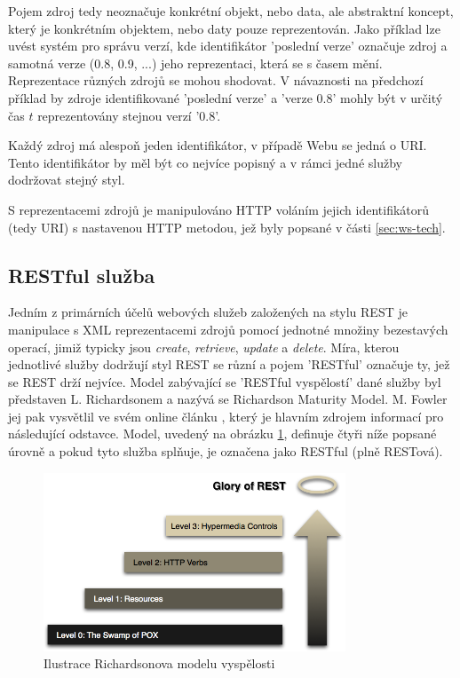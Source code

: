 \documentclass[czech,DP]{thesiskiv}
\begin{document}
Pojem zdroj tedy neoznačuje konkrétní objekt, nebo data, ale abstraktní koncept, který je konkrétním objektem, nebo daty pouze reprezentován. Jako příklad lze uvést systém pro správu verzí, kde identifikátor 'poslední verze' označuje zdroj a samotná verze (0.8, 0.9, ...) jeho reprezentaci, která se s časem mění. Reprezentace různých zdrojů se mohou shodovat. V návaznosti na předchozí příklad by zdroje identifikované 'poslední verze' a 'verze 0.8' mohly být v určitý čas $t$ reprezentovány stejnou verzí '0.8'. 

Každý zdroj má alespoň jeden identifikátor, v případě Webu se jedná o URI. Tento identifikátor by měl být co nejvíce popisný a v rámci jedné služby dodržovat stejný styl\cite{restfulWebServices}. 

S reprezentacemi zdrojů je manipulováno HTTP voláním jejich identifikátorů (tedy URI) s nastavenou HTTP metodou, jež byly popsané v části \ref{sec:ws-tech}.

\subsection{RESTful služba}
\label{sec:restful}

Jedním z primárních účelů webových služeb založených na stylu REST je manipulace s XML reprezentacemi zdrojů pomocí jednotné množiny bezestavých operací, jimiž typicky jsou  \textit{create}, \textit{retrieve}, \textit{update} a \textit{delete}\cite{w3cWsArch}. Míra, kterou jednotlivé služby dodržují styl REST se různí a pojem 'RESTful' označuje ty, jež se REST drží nejvíce. Model zabývající se 'RESTful vyspělostí' dané služby byl představen L. Richardsonem a nazývá se Richardson Maturity Model. M. Fowler jej pak vysvětlil ve svém online článku \cite{restfulMaturity}, který je hlavním zdrojem informací pro následující odstavce. Model, uvedený na obrázku \ref{fig:rmm}, definuje čtyři níže popsané úrovně a pokud tyto služba splňuje, je označena jako RESTful (plně RESTová).

\begin{figure}[h]
	\centering
	\includegraphics[width=9cm]{richardsonMaturityModel}
	\caption{Ilustrace Richardsonova modelu vyspělosti}
	\label{fig:rmm}
\end{figure}
\end{document}
